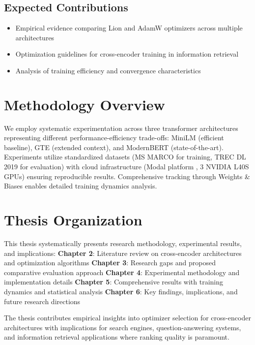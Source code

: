 \subsection{Expected Contributions}
\begin{itemize}
\item Empirical evidence comparing Lion and AdamW optimizers across multiple architectures
\item Optimization guidelines for cross-encoder training in information retrieval
\item Analysis of training efficiency and convergence characteristics
\end{itemize}

\section{Methodology Overview}

We employ systematic experimentation across three transformer architectures representing different performance-efficiency trade-offs: MiniLM (efficient baseline), GTE (extended context), and ModernBERT (state-of-the-art). Experiments utilize standardized datasets (MS MARCO \cite{DBLP:journals/corr/NguyenRSGTMD16} for training, TREC DL 2019 \cite{craswell2020overview} for evaluation) with cloud infrastructure (Modal platform \cite{modal_labs}, 3 NVIDIA L40S GPUs) ensuring reproducible results. Comprehensive tracking through Weights \& Biases \cite{wandb2020} enables detailed training dynamics analysis.

\section{Thesis Organization}

This thesis systematically presents research methodology, experimental results, and implications:
\textbf{Chapter 2}: Literature review on cross-encoder architectures and optimization algorithms
\textbf{Chapter 3}: Research gaps and proposed comparative evaluation approach  
\textbf{Chapter 4}: Experimental methodology and implementation details
\textbf{Chapter 5}: Comprehensive results with training dynamics and statistical analysis
\textbf{Chapter 6}: Key findings, implications, and future research directions

The thesis contributes empirical insights into optimizer selection for cross-encoder architectures with implications for search engines, question-answering systems, and information retrieval applications where ranking quality is paramount.
